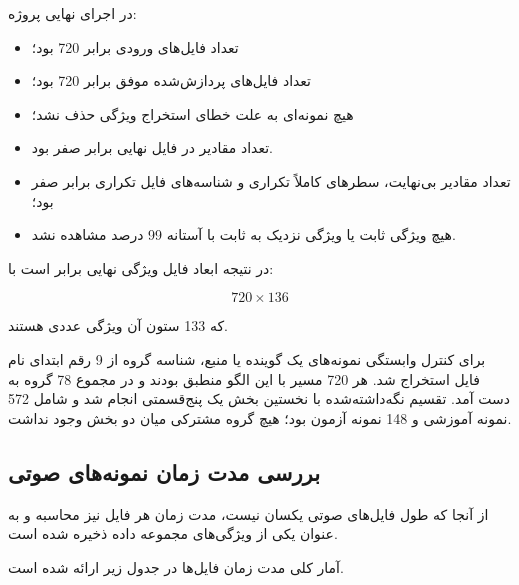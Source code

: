\documentclass[12pt,a4paper,oneside]{report}
\begin{document}
در اجرای نهایی پروژه:

\begin{itemize}

	\item تعداد فایل‌های ورودی برابر 720 بود؛

	\item تعداد فایل‌های پردازش‌شده موفق برابر 720 بود؛

	\item هیچ نمونه‌ای به علت خطای استخراج ویژگی حذف نشد؛

	\item تعداد مقادیر
	در فایل نهایی برابر صفر بود.

	\item تعداد مقادیر بی‌نهایت، سطرهای کاملاً تکراری و شناسه‌های فایل تکراری برابر صفر بود؛

	\item هیچ ویژگی ثابت یا ویژگی نزدیک به ثابت با آستانه 99 درصد مشاهده نشد.

\end{itemize}

در نتیجه ابعاد فایل ویژگی نهایی برابر است با:

\begin{equation}
720\times136
\end{equation}

که 133 ستون آن ویژگی عددی هستند.

برای کنترل وابستگی نمونه‌های یک گوینده یا منبع، شناسه گروه از 9 رقم ابتدای نام فایل استخراج شد. هر 720 مسیر با این الگو منطبق بودند و در مجموع 78 گروه به دست آمد. تقسیم نگه‌داشته‌شده با نخستین بخش یک
پنج‌قسمتی انجام شد و شامل 572 نمونه آموزشی و 148 نمونه آزمون بود؛ هیچ گروه مشترکی میان دو بخش وجود نداشت.


\subsection{بررسی مدت زمان نمونه‌های صوتی}

از آنجا که طول فایل‌های صوتی یکسان نیست، مدت زمان هر فایل نیز محاسبه و به عنوان یکی از ویژگی‌های مجموعه داده ذخیره شده است.

آمار کلی مدت زمان فایل‌ها در جدول زیر ارائه شده است.
\end{document}
